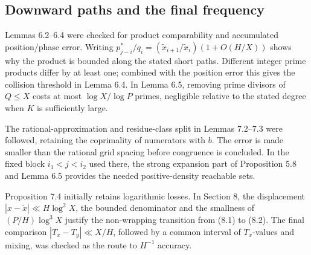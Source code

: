 \documentclass[10pt]{article}
\begin{document}
\subsection*{Downward paths and the final frequency}
Lemmas 6.2–6.4 were checked for product comparability and accumulated position/phase error. Writing \(p^\ast_{j-i}/q_i=(\widetilde x_{i+1}/\widetilde x_i)(1+O(H/X))\) shows why the product is bounded along the stated short paths. Different integer prime products differ by at least one; combined with the position error this gives the collision threshold in Lemma 6.4. In Lemma 6.5, removing prime divisors of \(Q\le X\) costs at most \(\log X/\log P\) primes, negligible relative to the stated degree when \(K\) is sufficiently large.\par
The rational-approximation and residue-class split in Lemmas 7.2–7.3 were followed, retaining the coprimality of numerators with \(b\). The error is made smaller than the rational grid spacing before congruence is concluded. In the fixed block \(i_1<j<i_2\) used there, the strong expansion part of Proposition 5.8 and Lemma 6.5 provides the needed positive-density reachable sets.\par
Proposition 7.4 initially retains logarithmic losses. In Section 8, the displacement \(|x-\widetilde x|\ll H\log^2X\), the bounded denominator and the smallness of \((P/H)\log^3X\) justify the non-wrapping transition from (8.1) to (8.2). The final comparison \(|T_x-T_y|\ll X/H\), followed by a common interval of \(T_x\)-values and mixing, was checked as the route to \(H^{-1}\) accuracy.\par
\end{document}
